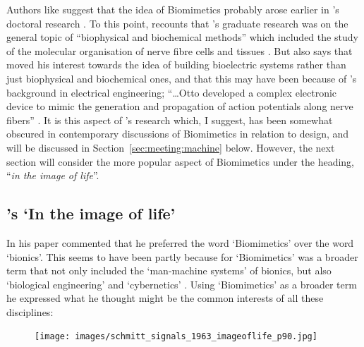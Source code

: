 Authors like \citeauthor{bhushan_biomimetics_2009} suggest that the idea of Biomimetics probably arose earlier in \citeauthor{schmitt_biomimetic_1973}'s doctoral research \cite[p.~1445]{bhushan_biomimetics_2009}. To this point, \citeauthor{harkness_appreciation_2002} recounts that \citeauthor{schmitt_biomimetic_1973}'s graduate research was on the general topic of ``biophysical and biochemical methods'' which included the study of the molecular organisation of nerve fibre cells and tissues \cite[p.465]{harkness_appreciation_2002}. But \citeauthor{harkness_appreciation_2002} also says that \citeauthor{schmitt_biomimetic_1973} moved his interest towards the idea of building bioelectric systems rather than just biophysical and biochemical ones, and that this may have been because of \citeauthor{schmitt_biomimetic_1973}'s background in electrical engineering; ``\dots Otto developed a complex electronic device to mimic the generation and propagation of action potentials along nerve fibers'' \cite[p.465]{harkness_appreciation_2002}. It is this aspect of \citeauthor{schmitt_biomimetic_1973}'s research which, I suggest, has been somewhat obscured in contemporary discussions of Biomimetics in relation to design, and will be discussed in Section~\ref{sec:meeting:machine} below. However, the next section will consider the more popular aspect of Biomimetics under the heading, ``\textit{in the image of life}''.

\subsection{\citeauthor{schmitt_biomimetic_1973}'s `In the image of life'}
\label{sec:image:life}

In his \citeyear{schmitt_signals_1963} paper \citeauthor{schmitt_signals_1963} commented that he preferred the word `Biomimetics' over the word `bionics'. This seems to have been partly because for \citeauthor{schmitt_signals_1963} `Biomimetics' was a broader term that not only included the `man-machine systems' of bionics, but also `biological engineering' and `cybernetics' \cite[p.~90]{schmitt_signals_1963}. Using `Biomimetics' as a broader term he expressed what he thought might be the common interests of all these disciplines: 

\begin{figure}[H]
    \centering
    \texttt{[image: images/schmitt\_signals\_1963\_imageoflife\_p90.jpg]}
    \caption{\cite[p.~90]{schmitt_signals_1963}}
    \label{fig:schmitt:1963:life}
\end{figure}

